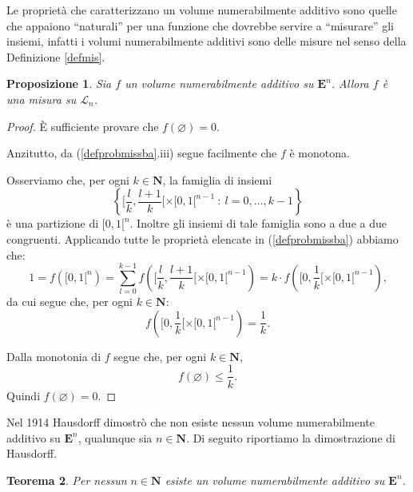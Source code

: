 \documentclass[a4paper,oneside,11pt]{book}
\theoremstyle{definition} \newtheorem{Def}{Definizione}
\theoremstyle{plain} \newtheorem{teo}{Teorema}
\theoremstyle{plain} \newtheorem{cor}[teo]{Corollario}
\theoremstyle{definition} \newtheorem{lem}[teo]{Lemma}
\theoremstyle{plain} \newtheorem{pro}[teo]{Proposizione}
\newcommand{\ug}[1]{(\ref{#1})} %
\begin{document}
	Le proprietà che caratterizzano un volume numerabilmente additivo sono quelle che appaiono ``naturali'' per una funzione che dovrebbe servire a ``misurare'' gli insiemi, infatti i volumi numerabilmente additivi sono delle misure nel senso della Definizione \ref{defmis}. 
	
	\begin{pro}\label{teomisvol} %
		Sia $f$ un volume numerabilmente additivo su $\mathbf{E}^n$. Allora $f$ è una misura su $\mathcal{L}_n$.
	\end{pro}
	
	\begin{proof}
		È sufficiente provare che $f(\varnothing) = 0$. 
		
		Anzitutto, da (\ref{defprobmissba}.iii) segue facilmente che $f$ è monotona.
		
		Osserviamo che, per ogni $k \in \mathbf{N}$, la famiglia di insiemi
		\begin{equation*}
			\left\{ [ \frac{l}{k}, \frac{l+1}{k} [ \times [0,1[^{n-1}\ :\ l = 0, \dots, k-1 \right\}%
		\end{equation*}
		è una partizione di $[0,1[^n$. Inoltre gli insiemi di tale famiglia sono a due a due congruenti. Applicando tutte le proprietà elencate in \ug{defprobmissba} abbiamo che:
		\begin{equation*}
			1 = f([0,1[^n) = \sum_{l=0}^{k-1}  f\left( [\frac{l}{k}, \frac{l+1}{k}[ \times [0,1[^{n-1} \right) = k \cdot f\left([0,\frac{1}{k}[ \times [0,1[^{n-1}\right)\text{,}
		\end{equation*}
		da cui segue che, per ogni $k \in \mathbf{N}$:
		\begin{equation*}
			f\left([0,\frac{1}{k}[ \times [0,1[^{n-1}\right) = \frac{1}{k}\text{.}
		\end{equation*}
		
		Dalla monotonia di $f$ segue che, per ogni $k \in \mathbf{N}$, 
		\begin{equation*}
			f(\varnothing) \leq \frac{1}{k}\text{.}
		\end{equation*}
		Quindi $f(\varnothing) = 0$.
	\end{proof}
	
	Nel 1914 Hausdorff dimostrò che non esiste nessun volume numerabilmente additivo su $\mathbf{E}^n$, qualunque sia $n \in \mathbf{N}$. Di seguito riportiamo la dimostrazione di Hausdorff.		
	
	\begin{teo}\label{ncvg} %
		Per nessun $n \in \mathbf{N}$ esiste un volume numerabilmente additivo su $\mathbf{E}^n$.
	\end{teo}
	
\end{document}
